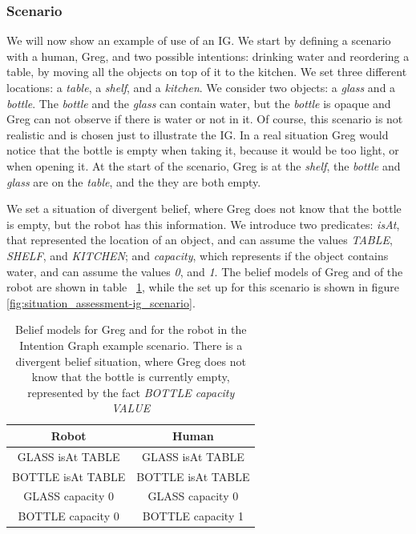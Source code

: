 \subsubsection{Scenario}
We will now show an example of use of an IG. We start by defining a scenario with a human, Greg, and two possible intentions: drinking water and reordering a table, by moving all the objects on top of it to the kitchen. We set three different locations: a \textit{table}, a \textit{shelf}, and a \textit{kitchen}. We consider two objects: a \textit{glass} and a \textit{bottle}. The \textit{bottle} and the \textit{glass} can contain water, but the \textit{bottle} is opaque and Greg can not observe if there is water or not in it. Of course, this scenario is not realistic and is chosen just to illustrate the IG. In a real situation Greg would notice that the bottle is empty when taking it, because it would be too light, or when opening it.
At the start of the scenario, Greg is at the \textit{shelf}, the \textit{bottle} and \textit{glass} are on the \textit{table}, and the they are both empty. 

We set a situation of divergent belief, where Greg does not know that the bottle is empty, but the robot has this information. 
We introduce two predicates: \textit{isAt}, that represented the location of an object, and can assume the values \textit{TABLE}, \textit{SHELF}, and \textit{KITCHEN}; and \textit{capacity}, which represents if the object contains water, and can assume the values \textit{0}, and \textit{1}. 
The belief models of Greg and of the robot are shown in table ~\ref{table:situation_assessment-ig_bm}, while the set up for this scenario is shown in figure \ref{fig:situation_assessment-ig_scenario}.

 \begin{table}[h!]
\centering
\scriptsize
\renewcommand{\arraystretch}{1.3}
\begin{tabular}{|c|c|}
\hline
Robot & Human \\ \hline \hline
GLASS isAt TABLE  & GLASS isAt TABLE \\ \hline
BOTTLE isAt TABLE & BOTTLE isAt TABLE \\ \hline
GLASS capacity 0  & GLASS capacity 0  \\ \hline
BOTTLE capacity 0 & BOTTLE capacity 1 \\ 
\hline
\end{tabular}
\caption[Belief models in the IG scenario]{Belief models for Greg and for the robot in the Intention Graph example scenario. There is a divergent belief situation, where Greg does not know that the bottle is currently empty, represented by the fact \textit{BOTTLE capacity VALUE} }
 \label{table:situation_assessment-ig_bm}    
\end{table}



